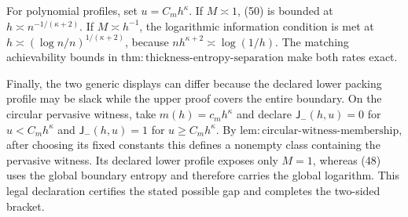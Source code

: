 For polynomial profiles, set \(u=C_mh^\kappa\). If \(M\asymp1\), (50) is bounded at \(h\asymp n^{-1/(\kappa+2)}\). If \(M\asymp h^{-1}\), the logarithmic information condition is met at \(h\asymp(\log n/n)^{1/(\kappa+2)}\), because \(nh^{\kappa+2}\asymp\log(1/h)\). The matching achievability bounds in \(\mathrm{thm:thickness\text{-}entropy\text{-}separation}\) make both rates exact.

Finally, the two generic displays can differ because the declared lower packing profile may be slack while the upper proof covers the entire boundary. On the circular pervasive witness, take \(m(h)=c_mh^\kappa\) and declare \(\mathsf J_{-}(h,u)=0\) for \(u<C_mh^\kappa\) and \(\mathsf J_{-}(h,u)=1\) for \(u\ge C_mh^\kappa\). By \(\mathrm{lem:circular\text{-}witness\text{-}membership}\), after choosing its fixed constants this defines a nonempty class containing the pervasive witness. Its declared lower profile exposes only \(M=1\), whereas (48) uses the global boundary entropy and therefore carries the global logarithm. This legal declaration certifies the stated possible gap and completes the two-sided bracket.